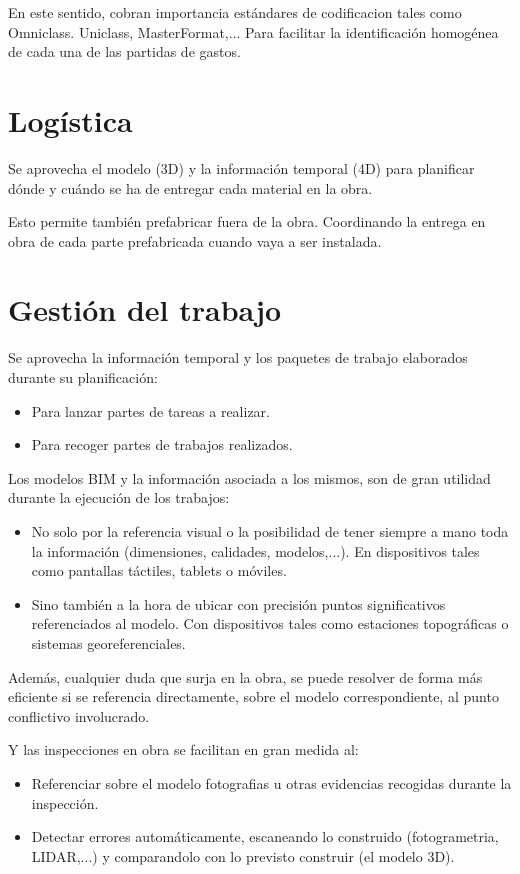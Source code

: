 \documentclass[spanish,12pt,a4paper,final,oneside]{book}
\begin{document}
En este sentido, cobran importancia estándares de codificacion tales como Omniclass. Uniclass, MasterFormat,... Para facilitar la identificación homogénea de cada una de las partidas de gastos. 

\section{Logística}
Se aprovecha el modelo (3D) y la información temporal (4D) para planificar dónde y cuándo se ha de entregar cada material en la obra.

Esto permite también prefabricar fuera de la obra. Coordinando la entrega en obra de cada parte prefabricada cuando vaya a ser instalada.

\section{Gestión del trabajo}
Se aprovecha la información temporal y los paquetes de trabajo elaborados durante su planificación:
\begin{itemize}
\item Para lanzar partes de tareas a realizar.
\item Para recoger partes de trabajos realizados.
\end{itemize}

Los modelos BIM y la información asociada a los mismos, son de gran utilidad durante la ejecución de los trabajos:
\begin{itemize}
\item No solo por la referencia visual o la posibilidad de tener siempre a mano toda la información (dimensiones, calidades, modelos,...). En dispositivos tales como pantallas táctiles, tablets o móviles.
\item Sino también a la hora de ubicar con precisión puntos significativos referenciados al modelo. Con dispositivos tales como estaciones topográficas o sistemas georeferenciales.
\end{itemize}

Además, cualquier duda que surja en la obra, se puede resolver de forma más eficiente si se referencia directamente, sobre el modelo correspondiente, al punto conflictivo involucrado.

Y las inspecciones en obra se facilitan en gran medida al:
\begin{itemize}
\item Referenciar sobre el modelo fotografias u otras evidencias recogidas durante la inspección.
\item Detectar errores automáticamente, escaneando lo construido (fotogrametria, LIDAR,...) y comparandolo con lo previsto construir (el modelo 3D).
\end{itemize}
\end{document}
